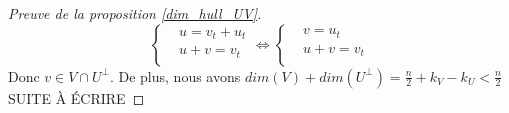 \documentclass[12pt]{article}
\theoremstyle{plain}
\begin{document}
\begin{appendix}
\begin{proof}[Preuve de la proposition \ref{dim_hull_UV}]
\begin{equation*}
\left\{
\begin{aligned}
&u = v_t + u_t\\
&u + v = v_t\\
\end{aligned}
\right.
\iff
\left\{
\begin{aligned}
&v = u_t\\
&u + v = v_t\\
\end{aligned}
\right.
\end{equation*}
Donc $v\in V\cap U^{\bot}$.
De plus, nous avons $dim(V) + dim(U^{\bot}) = \frac{n}{2} +k_V - k_U < \frac{n}{2}$
SUITE À ÉCRIRE
\end{proof}

\end{appendix}



\end{document}

